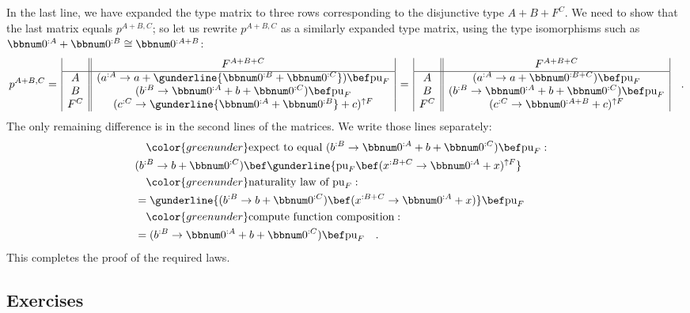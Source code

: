 In the last line, we have expanded the type matrix to three rows corresponding
to the disjunctive type $A+B+F^{C}$. We need to show that the last
matrix equals $p^{A+B,C}$; so let us rewrite $p^{A+B,C}$ as a similarly
expanded type matrix, using the type isomorphisms such as $\bbnum 0^{:A}+\bbnum 0^{:B}\cong\bbnum 0^{:A+B}$:
\[
p^{A+B,C}=\,\begin{array}{|c||c|}
 & F^{A+B+C}\\
\hline A & (a^{:A}\rightarrow a+\gunderline{\bbnum 0^{:B}+\bbnum 0^{:C}})\bef\text{pu}_{F}\\
B & (b^{:B}\rightarrow\bbnum 0^{:A}+b+\bbnum 0^{:C})\bef\text{pu}_{F}\\
F^{C} & (c^{:C}\rightarrow\gunderline{\bbnum 0^{:A}+\bbnum 0^{:B}}+c)^{\uparrow F}
\end{array}\,=\,\begin{array}{|c||c|}
 & F^{A+B+C}\\
\hline A & (a^{:A}\rightarrow a+\bbnum 0^{:B+C})\bef\text{pu}_{F}\\
B & (b^{:B}\rightarrow\bbnum 0^{:A}+b+\bbnum 0^{:C})\bef\text{pu}_{F}\\
F^{C} & (c^{:C}\rightarrow\bbnum 0^{:A+B}+c)^{\uparrow F}
\end{array}\quad.
\]
The only remaining difference is in the second lines of the matrices.
We write those lines separately: 
\begin{align*}
 & \quad{\color{greenunder}\text{expect to equal }(b^{:B}\rightarrow\bbnum 0^{:A}+b+\bbnum 0^{:C})\bef\text{pu}_{F}:}\quad\\
 & (b^{:B}\rightarrow b+\bbnum 0^{:C})\bef\gunderline{\text{pu}_{F}\bef(x^{:B+C}\rightarrow\bbnum 0^{:A}+x)^{\uparrow F}}\\
 & \quad{\color{greenunder}\text{naturality law of }\text{pu}_{F}:}\quad\\
 & =\gunderline{(b^{:B}\rightarrow b+\bbnum 0^{:C})\bef(x^{:B+C}\rightarrow\bbnum 0^{:A}+x)}\bef\text{pu}_{F}\\
 & \quad{\color{greenunder}\text{compute function composition}:}\quad\\
 & =(b^{:B}\rightarrow\bbnum 0^{:A}+b+\bbnum 0^{:C})\bef\text{pu}_{F}\quad.
\end{align*}
This completes the proof of the required laws.

\subsection{Exercises}

